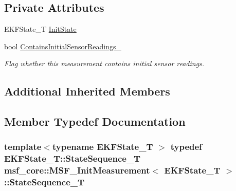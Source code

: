 \subsection*{Private Attributes}
\begin{DoxyCompactItemize}
\item 
E\-K\-F\-State\-\_\-\-T \hyperlink{classmsf__core_1_1MSF__InitMeasurement_a3eec8952562e2632f9c6f1b23ee49aec}{Init\-State}
\item 
bool \hyperlink{classmsf__core_1_1MSF__InitMeasurement_a8dfcbfdee2b01e6afd0a2160b613acfa}{Contains\-Initial\-Sensor\-Readings\-\_\-}
\begin{DoxyCompactList}\small\item\em Flag whether this measurement contains initial sensor readings. \end{DoxyCompactList}\end{DoxyCompactItemize}
\subsection*{Additional Inherited Members}


\subsection{Member Typedef Documentation}
\hypertarget{classmsf__core_1_1MSF__InitMeasurement_ad7fbcb406d4386f3a3088ecf8eb17585}{
\subsubsection[{State\-Sequence\-\_\-\-T}]{\setlength{\rightskip}{0pt plus 5cm}template$<$typename E\-K\-F\-State\-\_\-\-T $>$ typedef E\-K\-F\-State\-\_\-\-T\-::\-State\-Sequence\-\_\-\-T {\bf msf\-\_\-core\-::\-M\-S\-F\-\_\-\-Init\-Measurement}$<$ E\-K\-F\-State\-\_\-\-T $>$\-::{\bf State\-Sequence\-\_\-\-T}\hspace{0.3cm}{\ttfamily [private]}}}\label{classmsf__core_1_1MSF__InitMeasurement_ad7fbcb406d4386f3a3088ecf8eb17585}


